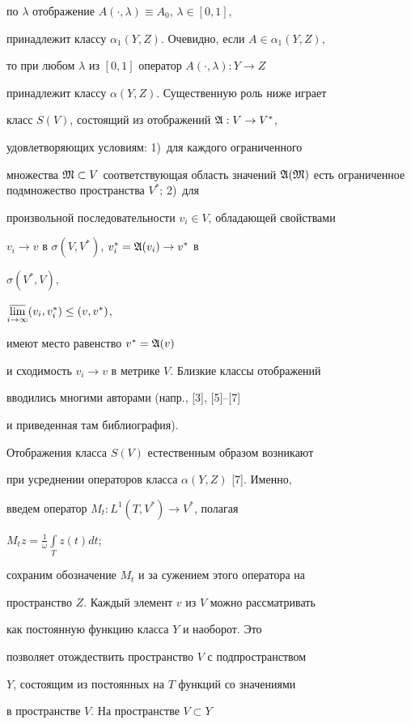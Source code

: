 по $\lambda$ отображение $A(\cdot,\lambda)\equiv A_0$, $\lambda\in[0,1]$, 


принадлежит классу $\alpha_1(Y,Z)$. Очевидно, если $A\in\alpha_1(Y,Z)$, 


то при любом $\lambda$ из $[0,1]$ оператор $A(\cdot,\lambda):Y\to Z$ 


принадлежит классу $\alpha(Y,Z)$. Существенную роль ниже играет 


класс $S(V)$, состоящий из отображений $\frak A:V\to V^*$, 


удовлетворяющих условиям: 1)~для каждого ограниченного 


множества $\frak M\subset V$ соответствующая область значений $\frak 


A(\frak M)$ есть ограниченное подмножество пространства $V^*$; 2)~для 


произвольной последовательности $v_i\in V$, обладающей свойствами 


$v_i\to v$ в $\sigma(V,V^*)$, $v^*_i=\frak A(v_i)\to v^*$ в 


$\sigma(V^*,V)$, 


$\underset{i\to\infty}{\varlimsup}{}(v_i,v^*_i)\le(v,v^*)$, 


имеют место равенство $v^*=\frak A(v)$ 


и сходимость $v_i\to v$ в метрике $V$. Близкие классы отображений 


вводились многими авторами (напр., [3], [5]--[7] 


и приведенная там библиография). 


 


Отображения класса $S(V)$ естественным образом возникают 


при усреднении операторов класса $\alpha(Y,Z)$ [7]. Именно, 


введем оператор $M_t:L^1(T,V^*)\to V^*$, полагая 


$M_t z=\frac{1}{\omega}\int\limits_T z(t)d t$; 


сохраним обозначение $M_t$ и за сужением этого оператора на 


пространство $Z$. Каждый элемент $v$ из $V$ можно рассматривать 


как постоянную функцию класса $Y$ и наоборот. Это 


позволяет отождествить пространство $V$ с подпространством 


$Y$, состоящим из постоянных на $T$ функций со значениями 


в пространстве $V$. На пространстве $V\subset Y$ 


